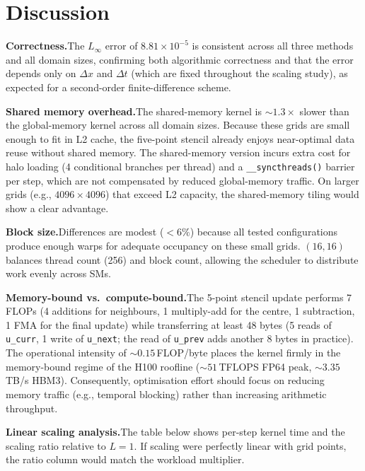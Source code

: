 \documentclass[11pt,a4paper]{article}
\newcommand{\code}[1]{\texttt{\small\colorbox{codebg}{#1}}}
\begin{document}
\section{Discussion}

\textbf{Correctness.}\quad The $L_\infty$ error of $8.81 \times 10^{-5}$ is consistent across all three methods and all domain sizes, confirming both algorithmic correctness and that the error depends only on $\Delta x$ and $\Delta t$ (which are fixed throughout the scaling study), as expected for a second-order finite-difference scheme.

\textbf{Shared memory overhead.}\quad The shared-memory kernel is ${\sim}1.3\times$ slower than the global-memory kernel across all domain sizes. Because these grids are small enough to fit in L2 cache, the five-point stencil already enjoys near-optimal data reuse without shared memory. The shared-memory version incurs extra cost for halo loading (4 conditional branches per thread) and a \code{\_\_syncthreads()} barrier per step, which are not compensated by reduced global-memory traffic. On larger grids (e.g., $4096 \times 4096$) that exceed L2 capacity, the shared-memory tiling would show a clear advantage.

\textbf{Block size.}\quad Differences are modest ($<6\%$) because all tested configurations produce enough warps for adequate occupancy on these small grids. $(16,16)$ balances thread count (256) and block count, allowing the scheduler to distribute work evenly across SMs.

\textbf{Memory-bound vs.\ compute-bound.}\quad The 5-point stencil update performs 7 FLOPs (4 additions for neighbours, 1 multiply-add for the centre, 1 subtraction, 1 FMA for the final update) while transferring at least 48 bytes (5 reads of \code{u\_curr}, 1 write of \code{u\_next}; the read of \code{u\_prev} adds another 8 bytes in practice). The operational intensity of ${\sim}0.15$\,FLOP/byte places the kernel firmly in the memory-bound regime of the H100 roofline (${\sim}51$\,TFLOPS FP64 peak, ${\sim}3.35$\,TB/s HBM3). Consequently, optimisation effort should focus on reducing memory traffic (e.g., temporal blocking) rather than increasing arithmetic throughput.

\textbf{Linear scaling analysis.}\quad The table below shows per-step kernel time and the scaling ratio relative to $L\!=\!1$. If scaling were perfectly linear with grid points, the ratio column would match the workload multiplier.
\end{document}
